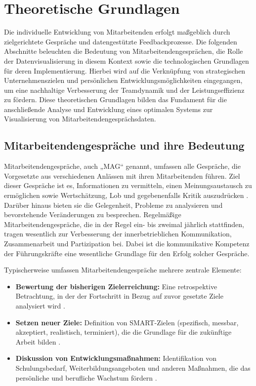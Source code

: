 \chapter{Theoretische Grundlagen}
\label{chap:theoretische-grundlagen}

Die individuelle Entwicklung von Mitarbeitenden erfolgt maßgeblich durch zielgerichtete Gespräche und datengestützte Feedbackprozesse. Die folgenden Abschnitte beleuchten die Bedeutung von Mitarbeitendengesprächen, die Rolle der Datenvisualisierung in diesem Kontext sowie die technologischen Grundlagen für deren Implementierung. Hierbei wird auf die Verknüpfung von strategischen Unternehmenszielen und persönlichen Entwicklungsmöglichkeiten eingegangen, um eine nachhaltige Verbesserung der Teamdynamik und der Leistungseffizienz zu fördern. Diese theoretischen Grundlagen bilden das Fundament für die anschließende Analyse und Entwicklung eines optimalen Systems zur Visualisierung von Mitarbeitendengesprächsdaten.

\section{Mitarbeitendengespräche und ihre Bedeutung}
Mitarbeitendengespräche, auch „MAG“ genannt, umfassen alle Gespräche, die Vorgesetzte aus verschiedenen Anlässen mit ihren Mitarbeitenden führen. Ziel dieser Gespräche ist es, Informationen zu vermitteln, einen Meinungsaustausch zu ermöglichen sowie Wertschätzung, Lob und gegebenenfalls Kritik auszudrücken \cite{schober2008}. Darüber hinaus bieten sie die Gelegenheit, Probleme zu analysieren und bevorstehende Veränderungen zu besprechen. Regelmäßige Mitarbeitendengespräche, die in der Regel ein- bis zweimal jährlich stattfinden, tragen wesentlich zur Verbesserung der innerbetrieblichen Kommunikation, Zusammenarbeit und Partizipation bei. Dabei ist die kommunikative Kompetenz der Führungskräfte eine wesentliche Grundlage für den Erfolg solcher Gespräche.

Typischerweise umfassen Mitarbeitendengespräche mehrere zentrale Elemente:
\begin{itemize}
    \item \textbf{Bewertung der bisherigen Zielerreichung:} Eine retrospektive Betrachtung, in der der Fortschritt in Bezug auf zuvor gesetzte Ziele analysiert wird \cite{duarte2012performance}.
    \item \textbf{Setzen neuer Ziele:} Definition von SMART-Zielen (spezifisch, messbar, akzeptiert, realistisch, terminiert), die die Grundlage für die zukünftige Arbeit bilden \cite{duarte2012performance}.
    \item \textbf{Diskussion von Entwicklungsmaßnahmen:} Identifikation von Schulungsbedarf, Weiterbildungsangeboten und anderen Maßnahmen, die das persönliche und berufliche Wachstum fördern \cite{bryson2011employee}.
\end{itemize}

